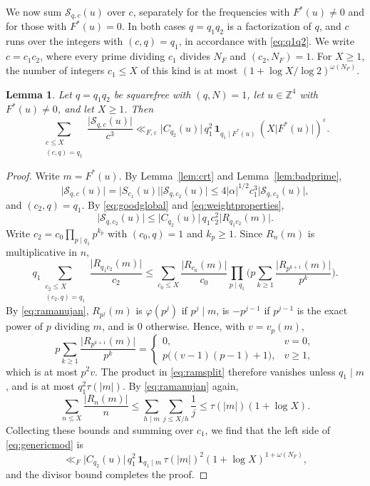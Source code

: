 \documentclass[11pt]{amsart}
\numberwithin{equation}{section}
\numberwithin{figure}{section}
\newtheorem{lemma}{Lemma}[section]
\theoremstyle{definition}
\newcommand{\Z}{\mathbb{Z}}
\newcommand{\eps}{\varepsilon}
\newcommand{\abs}[1]{\lvert #1\rvert}
\begin{document}
We now sum $\mathcal S_{q,c}(u)$ over $c$, separately for the
frequencies with $F^*(u)\ne0$ and for those with $F^*(u)=0$. In both
cases $q=q_1q_2$ is a factorization of $q$, and $c$ runs over the
integers with $(c,q)=q_1$, in accordance with \eqref{eq:q1q2}. We
write $c=c_1c_2$, where every prime dividing $c_1$ divides $N_F$ and
$(c_2,N_F)=1$. For $X\ge1$, the number of integers $c_1\le X$ of
this kind is at most $(1+\log X/\log2)^{\omega(N_F)}$.

\begin{lemma}\label{lem:genericmod}
Let $q=q_1q_2$ be squarefree with $(q,N)=1$, let $u\in\Z^4$ with
$F^*(u)\ne0$, and let $X\ge1$. Then
\begin{equation}\label{eq:genericmod}
 \sum_{\substack{c\le X\\(c,q)=q_1}}\frac{\abs{\mathcal S_{q,c}(u)}}{c^3}
 \ll_{F,\eps}\abs{C_{q_2}(u)}\,q_1^2\,\mathbf 1_{q_1\mid F^*(u)}
 \,(X\abs{F^*(u)})^\eps.
\end{equation}
\end{lemma}

\begin{proof}
Write $m=F^*(u)$. By Lemma~\ref{lem:crt} and
Lemma~\ref{lem:badprime},
\[
 \abs{\mathcal S_{q,c}(u)}=\abs{S_{c_1}(u)}\abs{\mathcal S_{q,c_2}(u)}
 \le4\abs\alpha^{1/2}c_1^3\abs{\mathcal S_{q,c_2}(u)},
\]
and $(c_2,q)=q_1$. By \eqref{eq:goodglobal} and
\eqref{eq:weightproperties},
\[
 \abs{\mathcal S_{q,c_2}(u)}\le\abs{C_{q_2}(u)}\,q_1c_2^2\abs{R_{q_1c_2}(m)}.
\]
Write $c_2=c_0\prod_{p\mid q_1}p^{k_p}$ with $(c_0,q)=1$ and
$k_p\ge1$. Since $R_n(m)$ is multiplicative in $n$,
\begin{equation}\label{eq:ramsplit}
 q_1\sum_{\substack{c_2\le X\\(c_2,q)=q_1}}\frac{\abs{R_{q_1c_2}(m)}}{c_2}
 \le\sum_{c_0\le X}\frac{\abs{R_{c_0}(m)}}{c_0}
 \prod_{p\mid q_1}\bigg(p\sum_{k\ge1}\frac{\abs{R_{p^{k+1}}(m)}}{p^k}\bigg).
\end{equation}
By \eqref{eq:ramanujan}, $R_{p^j}(m)$ is $\varphi(p^j)$ if
$p^j\mid m$, is $-p^{j-1}$ if $p^{j-1}$ is the exact power of $p$
dividing $m$, and is $0$ otherwise. Hence, with $v=v_p(m)$,
\[
 p\sum_{k\ge1}\frac{\abs{R_{p^{k+1}}(m)}}{p^k}
 =\begin{cases}0,&v=0,\\p\big((v-1)(p-1)+1\big),&v\ge1,\end{cases}
\]
which is at most $p^2v$. The product in \eqref{eq:ramsplit} therefore
vanishes unless $q_1\mid m$, and is at most $q_1^2\tau(\abs m)$. By
\eqref{eq:ramanujan} again,
\[
 \sum_{n\le X}\frac{\abs{R_n(m)}}n
 \le\sum_{h\mid m}\sum_{j\le X/h}\frac1j\le\tau(\abs m)(1+\log X).
\]
Collecting these bounds and summing over $c_1$, we find that the left
side of \eqref{eq:genericmod} is
\[
 \ll_F\abs{C_{q_2}(u)}\,q_1^2\,\mathbf 1_{q_1\mid m}\,
 \tau(\abs m)^2(1+\log X)^{1+\omega(N_F)},
\]
and the divisor bound completes the proof.
\end{proof}
\end{document}
